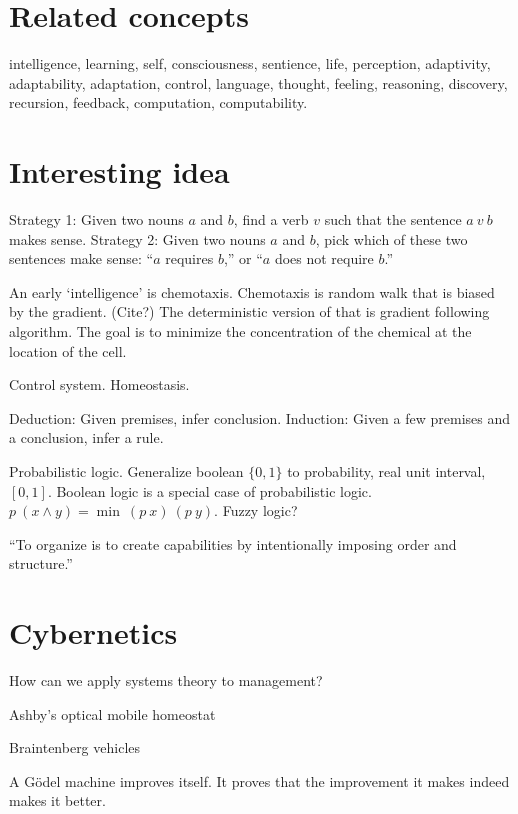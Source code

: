 \section{Related concepts}

intelligence, learning, self, consciousness, sentience, life, perception,
adaptivity, adaptability, adaptation, control, language, thought, feeling, reasoning, discovery,
recursion, feedback, computation, computability.

\section{Interesting idea}

Strategy 1:
Given two nouns \(a\) and \(b\), find a verb \(v\) such that the sentence \(a~v~b\) makes sense.
Strategy 2:
Given two nouns \(a\) and \(b\), pick which of these two sentences make sense:
``\(a\) requires \(b\),'' or ``\(a\) does not require \(b\).''

An early `intelligence' is chemotaxis.
Chemotaxis is random walk that is biased by the gradient. (Cite?)
The deterministic version of that is gradient following algorithm.
The goal is to minimize the concentration of the chemical at the location of the cell.

Control system. Homeostasis.

Deduction: Given premises, infer conclusion.
Induction: Given a few premises and a conclusion, infer a rule.

Probabilistic logic.
Generalize boolean \(\{0,1\}\) to probability, real unit interval, \([0,1]\).
Boolean logic is a special case of probabilistic logic.
\(p~(x \wedge y) = \min~(p~x)~(p~y)\).
Fuzzy logic?

``To organize is to create capabilities by intentionally imposing order and structure.'' \cite{Organ}

\section{Cybernetics}

How can we apply systems theory to management? \cite{SystemManage}

Ashby's optical mobile homeostat
\cite{BattleHom}
\cite{BattleThree}

Braintenberg vehicles

A G\"odel machine improves itself.
It proves that the improvement it makes indeed makes it better.
\cite{GodelMachImpl}


